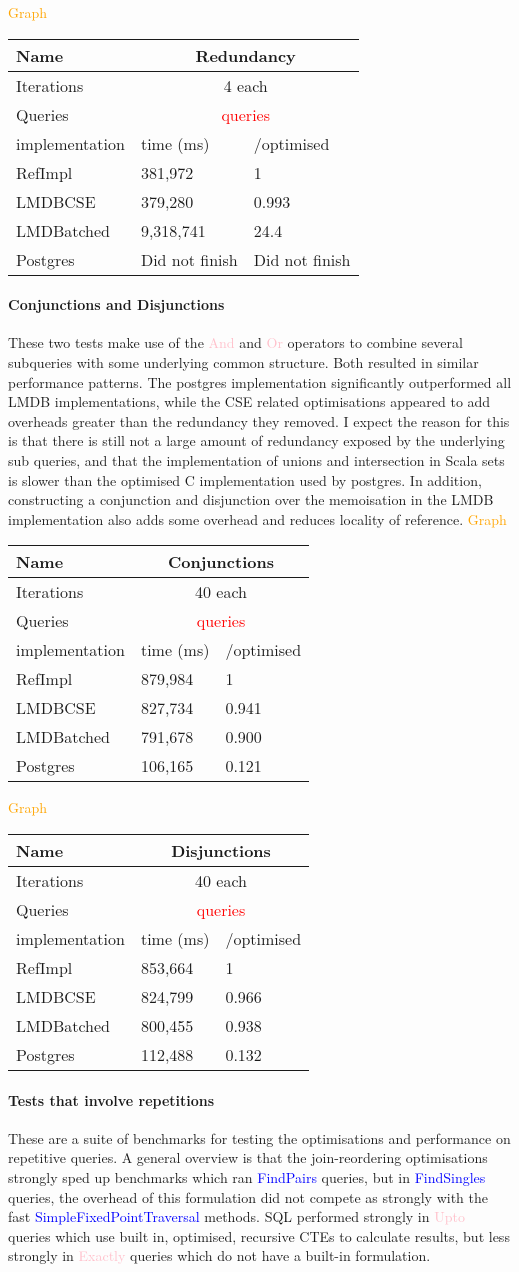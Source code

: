 \documentclass[12pt,a4paper,twoside,openright]{report}
\newcommand\todo[1]{\textcolor{red}{#1}}
\newcommand\codeName[1]{\textcolor{blue}{#1}}
\newcommand\diagramNeeded[1]{\textcolor{orange}{#1}}
\newcommand\mathName[1]{\textcolor{pink}{#1}}
\newcommand{\reference}{RefImpl}
\newcommand{\batched}{LMDBatched}
\newcommand{\cse}{LMDBCSE}
\newcommand{\postgres}{Postgres}
\newcommand\resultTable[4]{
\begin{center}
	\begin{tabular}{ |p{3cm}||p{3cm}|p{3cm}|  }
 	\hline
 		Name & \multicolumn{2}{|c|}{#1} \\
 	\hline
 		Iterations & \multicolumn{2}{|c|}{#2} \\
 	\hline
 		Queries & \multicolumn{2}{|c|}{#3} \\
 	\hline
 		implementation   	& 	time (ms) & /optimised \\
		#4
 	\hline
	\end{tabular}
\end{center}

}
\begin{document}
{{			\diagramNeeded{Graph}
			
\resultTable{Redundancy}{4 each}{\todo{queries}}{ \reference   	& 	381,972 & 1\\
 \cse 			&   379,280 & 0.993 \\
 \batched 		&	9,318,741 & 24.4 \\
 \postgres    	&	Did not finish & Did not finish \\
 } 

		\paragraph{Conjunctions and Disjunctions}
	These two tests make use of the \mathName{And} and  \mathName{Or} operators to combine several subqueries with some underlying common structure. Both resulted in similar performance patterns. The postgres implementation significantly outperformed all LMDB implementations, while the CSE related optimisations appeared to add overheads greater than the redundancy they removed. I expect the reason for this is that there is still not a large amount of redundancy exposed by the underlying sub queries, and that the implementation of unions and intersection in Scala sets is slower than the optimised C implementation used by postgres. In addition, constructing a conjunction and disjunction over the memoisation in the LMDB implementation also adds some overhead and reduces locality of reference.	
				\diagramNeeded{Graph}
\resultTable{Conjunctions}{40 each}{\todo{queries}}{ 
 \reference 			&   879,984 & 1 \\
 \cse 					&	827,734 & 0.941	\\
 \batched 				&   791,678 & 0.900 \\
 \postgres    			&	106,165 & 0.121 \\
 }
				\diagramNeeded{Graph}
	\resultTable{Disjunctions}{40 each}{\todo{queries}}{ 
 \reference 			&   853,664 & 1 \\
 \cse 					&	824,799 & 0.966	\\
 \batched				&   800,455 & 0.938 \\
 \postgres    			&	112,488 & 0.132 \\
 }	
		\paragraph{Tests that involve repetitions}
		These are a suite of benchmarks for testing the optimisations and performance on repetitive queries. A general overview is that the join-reordering optimisations strongly sped up benchmarks which ran \codeName{FindPairs} queries, but in \codeName{FindSingles} queries, the overhead of this formulation did not compete as strongly with the fast \codeName{SimpleFixedPointTraversal} methods. SQL performed strongly in \mathName{Upto} queries which use built in, optimised, recursive CTEs to calculate results, but less strongly in \mathName{Exactly} queries which do not have a built-in formulation.

}}
\end{document}
